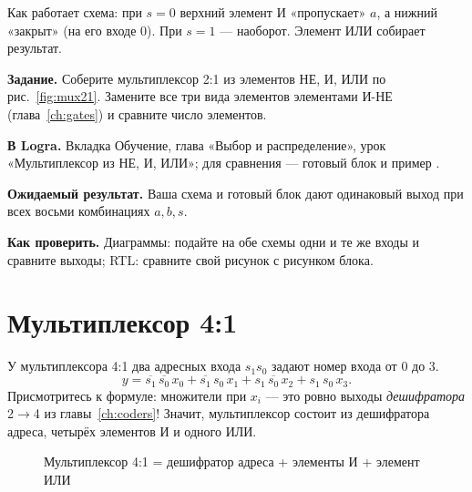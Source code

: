 Как работает схема: при $s = 0$ верхний элемент И «пропускает» $a$, а нижний
«закрыт» (на его входе 0). При $s = 1$ --- наоборот. Элемент ИЛИ собирает
результат.

\begin{diybox}
\textbf{Задание.}  Соберите мультиплексор 2:1 из элементов НЕ, И, ИЛИ
по рис.~\ref{fig:mux21}.  Замените все три вида элементов элементами
И-НЕ (глава~\ref{ch:gates}) и сравните число элементов.

\textbf{В Logra.} Вкладка Обучение, глава «Выбор и распределение», урок
«Мультиплексор из НЕ, И, ИЛИ»; для сравнения --- готовый блок и пример
.

\textbf{Ожидаемый результат.} Ваша схема и готовый блок дают одинаковый выход
при всех восьми комбинациях $a,b,s$.

\textbf{Как проверить.} Диаграммы: подайте на обе схемы одни и те же входы и
сравните выходы; RTL: сравните свой рисунок с рисунком блока.
\end{diybox}

\section{Мультиплексор 4:1}

У мультиплексора 4:1 два адресных входа $s_1 s_0$ задают номер входа от 0 до 3.
\[
  y = \overline{s_1}\,\overline{s_0}\,x_0 + \overline{s_1}\,s_0\,x_1 + s_1\,\overline{s_0}\,x_2 + s_1\,s_0\,x_3.
\]
Присмотритесь к формуле: множители при $x_i$ --- это ровно выходы
\emph{дешифратора} 2$\to$4 из главы~\ref{ch:coders}! Значит, мультиплексор
состоит из дешифратора адреса, четырёх элементов И и одного ИЛИ.

\begin{figure}[H]
\centering
{}
\caption{Мультиплексор 4:1 = дешифратор адреса + элементы И + элемент ИЛИ}
\label{fig:mux41}
\end{figure}

